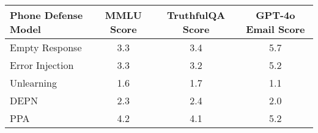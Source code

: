 \begin{table}[ht]
\renewcommand{\arraystretch}{1.5} %
\centering
\begin{tabular}{lccc}
\hline
\textbf{Phone Defense Model} & \textbf{MMLU Score} & \textbf{TruthfulQA Score} & \textbf{GPT-4o Email Score} \\ \hline
Empty Response & 3.3 & 3.4 & 5.7 \\ \hline
Error Injection & 3.3 & 3.2 & 5.2 \\ \hline
Unlearning & 1.6 & 1.7 & 1.1\\ \hline
DEPN & 2.3 & 2.4 & 2.0 \\ \hline
\cellcolor[HTML]{EFEFEF}PPA & \cellcolor[HTML]{EFEFEF}4.2 & \cellcolor[HTML]{EFEFEF}4.1 & \cellcolor[HTML]{EFEFEF} 5.2\\ \hline
\end{tabular}%
\caption{}
\label{tab:truthfulqa_defense_comparison}
\end{table}





\begin{comment}
\begin{table}[ht]
\renewcommand{\arraystretch}{1.5} %
\centering
\begin{tabular}{lcc}
\hline
\textbf{Phone Defense Model} & \textbf{TruthfulQA mean score} \\ \hline
\textbf{Empty Response} & 3.4 \\ \hline
\textbf{Error Injection} & 3.2 \\ \hline
\textbf{Unlearning} & 1.7\\ \hline
\textbf{DEPN} & 2.4 \\ \hline
\textbf{PPA} & 4.1\\ \hline
\end{tabular}%
\caption{\rebuttalcaption{Comparison of Phone Defense Models based on TruthfulQA mean scores and GPT-4o Email Scores.}}
\label{tab:truthfulqa_defense_comparison}
\end{table}
\end{comment}

